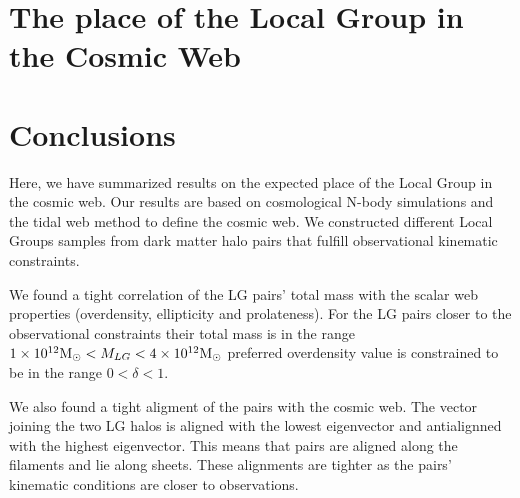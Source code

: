 \documentclass{iau}
\newcommand{\Msun}{{\ifmmode{{\rm {M_{\odot}}}}\else{${\rm{M_{\odot}}}$}\fi}}
\begin{document}
\section{The place of the Local Group in the Cosmic Web}

\section{Conclusions}

Here, we have summarized results on the expected place of the Local
Group in the cosmic web. Our results are based on cosmological N-body
simulations and the tidal web method to define the cosmic web. We
constructed different Local Groups samples from dark matter halo pairs
that fulfill observational kinematic constraints. 

We found a tight correlation of the LG pairs' total mass with the scalar
web properties (overdensity, ellipticity and prolateness). For the LG
pairs closer to the observational constraints their total mass is in
the range $1\times 10^{12}\Msun < M_{LG} < 4\times 10^{12}\Msun$
preferred overdensity value is constrained to be in the range
$0<\delta <1$. 

We also found a tight aligment of the pairs with the cosmic web. The
vector joining the two LG halos is aligned with the lowest eigenvector
and antialignned with the highest eigenvector. This means that pairs
are aligned along the filaments and lie along sheets. These alignments
are tighter as the pairs' kinematic conditions are closer to
observations.


 
\end{document}
